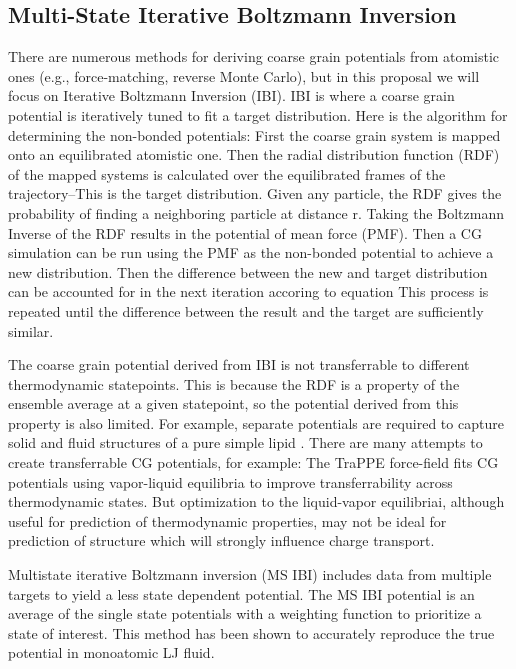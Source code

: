
\subsection*{Multi-State Iterative Boltzmann Inversion}

There are numerous methods for deriving coarse grain potentials from atomistic ones (e.g., force-matching, reverse Monte Carlo), but in this proposal we will focus on Iterative Boltzmann Inversion (IBI).
IBI is where a coarse grain potential is iteratively tuned to fit a target distribution\cite{Reith2003a}.
Here is the algorithm for determining the non-bonded potentials:
First the coarse grain system is mapped onto an equilibrated atomistic one.
Then the radial distribution function (RDF) of the mapped systems is calculated over the equilibrated frames of the trajectory--This is the target distribution.
Given any particle, the RDF gives the probability of finding a neighboring particle at distance r.
Taking the Boltzmann Inverse of the RDF results in the potential of mean force (PMF). %
Then a CG simulation can be run using the PMF as the non-bonded potential to achieve a new distribution.
Then the difference between the new and target distribution can be accounted for in the next iteration accoring to equation %
This process is repeated until the difference between the result and the target are sufficiently similar.

The coarse grain potential derived from IBI is not transferrable to different thermodynamic statepoints.
This is because the RDF is a property of the ensemble average at a given statepoint, so the potential derived from this property is also limited.
For example, separate potentials are required to capture solid and fluid structures of a pure simple lipid \cite{Hadley2010a}.
There are many attempts to create transferrable CG potentials, for example:
The TraPPE force-field fits CG potentials using vapor-liquid equilibria to improve transferrability across thermodynamic states\cite{Maerzke2011}.
But optimization to the liquid-vapor equilibriai, although useful for prediction of thermodynamic properties, may not be ideal for prediction of structure which will strongly influence charge transport.

Multistate iterative Boltzmann inversion (MS IBI) includes data from multiple targets to yield a less state dependent potential\cite{Moore2014}.
The MS IBI potential is an average of the single state potentials with a weighting function to prioritize a state of interest.
This method has been shown to accurately reproduce the true potential in monoatomic LJ fluid.

